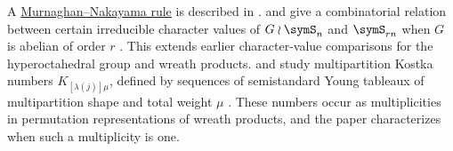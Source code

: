 A \hyperref[schurMurnaghanNakayama]{Murnaghan--Nakayama rule} is described
in \cite{MendesRemmelWagner2004}.
 and  give a combinatorial relation
between certain irreducible character values of $G\wr\symS_n$ and
$\symS_{rn}$ when $G$ is abelian of order $r$ \cite{KunduRay2025x}.  This
extends earlier character-value comparisons for the hyperoctahedral group and
wreath products.
 and 
study multipartition Kostka numbers $K_{[\lambda(j)]\mu}$, defined by
sequences of semistandard Young tableaux of multipartition shape and total
weight $\mu$ \cite{JanopaulNaylorVinroot2015x}.  These numbers occur as
multiplicities in permutation representations of wreath products, and the
paper characterizes when such a multiplicity is one.
